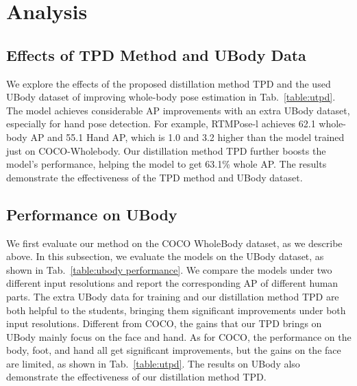 \documentclass[10pt,twocolumn,letterpaper]{article}
\begin{document}
\section{Analysis}
\subsection{Effects of TPD Method and UBody Data}
We explore the effects of the proposed distillation method TPD and the used UBody dataset of improving whole-body pose estimation in Tab.~\ref{table:utpd}. The model achieves considerable AP improvements with an extra UBody dataset, especially for hand pose detection. For example, RTMPose-l achieves 62.1 whole-body AP and 55.1 Hand AP, which is 1.0 and 3.2 higher than the model trained just on COCO-Wholebody. Our distillation method TPD further boosts the model's performance, helping the model to get 63.1\% whole AP. The results demonstrate the effectiveness of the TPD method and UBody dataset.

\begin{table}
  \centering
  \setlength{\tabcolsep}{12 pt}
  \vspace{0.1cm}
  \caption{Ablation study of the Two-stages Pose Distillation (TPD) method and the UBody Dataset. The teacher and student models used are RTMPose-x and RTMPose-l, respectively.}
  \label{table:utpd}
\end{table}

\subsection{Performance on UBody}
We first evaluate our method on the COCO WholeBody dataset, as we describe above. In this subsection, we evaluate the models on the UBody dataset, as shown in Tab.~\ref{table:ubody performance}. We compare the models under two different input resolutions and report the corresponding AP of different human parts. The extra UBody data for training and our distillation method TPD are both helpful to the students, bringing them significant improvements under both input resolutions. Different from COCO, the gains that our TPD brings on UBody mainly focus on the face and hand. As for COCO, the performance on the body, foot, and hand all get significant improvements, but the gains on the face are limited, as shown in Tab.~\ref{table:utpd}. The results on UBody also demonstrate the effectiveness of our distillation method TPD.
\end{document}
